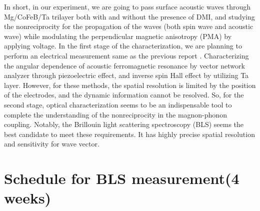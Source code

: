In short, in our experiment, we are going to pass surface acoustic waves through Mg/CoFeB/Ta trilayer both with and without the presence of DMI, and studying the nonreciprocity for the propagation of the waves (both spin wave and acoustic wave) while modulating the perpendicular magnetic anisotropy (PMA) by applying voltage. In the first stage of the characterization, we are planning to perform an electrical measurement same as the previous report \cite{XuIEEMS2018}. Characterizing the angular dependence of acoustic ferromagnetic resonance by vector network analyzer through piezoelectric effect, and inverse spin Hall effect by utilizing Ta layer. However, for these methods, the spatial resolution is limited by the position of the electrodes, and the dynamic information cannot be resolved. So, for the second stage, optical characterization seems to be an indispensable tool to complete the understanding of the nonreciprocity in the magnon-phonon coupling. Notably, the Brillouin light scattering spectroscopy (BLS) seems the best candidate to meet these requirements. It has highly precise spatial resolution and sensitivity for wave vector.  



\section*{Schedule for BLS measurement(4 weeks)}

